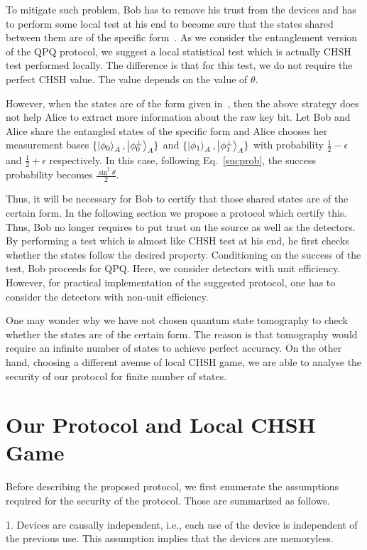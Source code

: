 \documentclass[twocolumn,pra,aps,amssymb]{revtex4}
\begin{document}
To mitigate such problem, Bob has to remove his trust from the devices and has to perform some local test at his end to become sure that the states shared between them are of the specific form~\cite{Yang}. As we consider the entanglement version of the QPQ protocol, we suggest a local statistical test which is actually CHSH test performed locally. The difference is that for this test, we do not require the perfect CHSH value. The value depends on the value of $\theta$.

However, when the states are of the form given in~\cite{Yang}, then the above strategy does not help Alice to extract more information about the raw key bit. Let Bob and Alice share the entangled states of the specific form and Alice chooses her measurement bases $\{\left|\phi_0\right\rangle_{A},\left|\phi_0^{\perp}\right\rangle_{A}\}$ and $\{\left|\phi_1\right\rangle_{A},\left|\phi_1^{\perp}\right\rangle_{A}\}$ with probability $\frac{1}{2}-\epsilon$ and $\frac{1}{2}+\epsilon$ respectively. In this case, following Eq.~\eqref{sucprob}, the success probability becomes
$\frac{\sin^2\theta}{2}$.

Thus, it will be necessary for Bob to certify that those shared states are of the certain form. In the following section we propose a protocol which certify this. Thus, Bob no longer requires to put trust on the source as well as the detectors. By performing a test which is almost like CHSH test at his end, he first checks whether the states follow the desired property. Conditioning on the success of the test, Bob proceeds for QPQ. Here, we consider detectors with unit efficiency. However, for practical implementation of the suggested protocol, one has to consider the detectors with non-unit efficiency. 


One may wonder why we have not chosen quantum state tomography to check whether the states are of the certain form. The reason is that tomography would require an infinite number of states to achieve perfect accuracy. On the other hand, choosing a different avenue of local CHSH game, we are able to analyse the security of our protocol for finite number of states.

\section{Our Protocol and Local CHSH Game}
Before describing the proposed protocol, we first enumerate the assumptions required for the security of the protocol. Those are summarized as follows.

1. Devices are causally independent, i.e., each use of the device is independent of the previous use. This assumption implies that the devices are memoryless.
\end{document}
